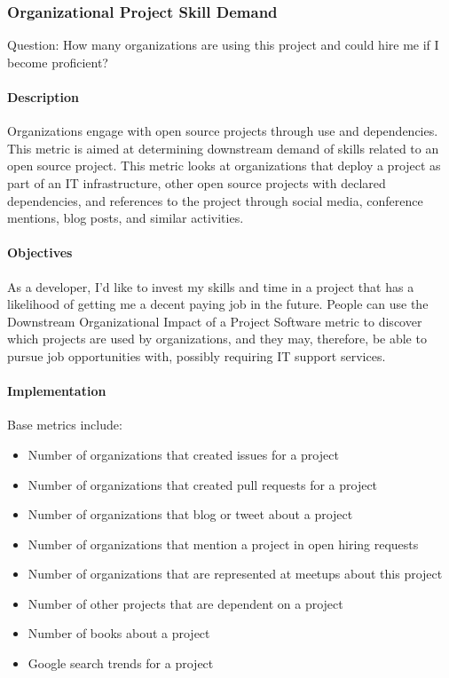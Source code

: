 \hypertarget{organizational-project-skill-demand}{%
\subsubsection{Organizational Project Skill
Demand}\label{organizational-project-skill-demand}}

Question: How many organizations are using this project and could hire
me if I become proficient?

\hypertarget{description}{%
\paragraph{Description}\label{description}}

Organizations engage with open source projects through use and
dependencies. This metric is aimed at determining downstream demand of
skills related to an open source project. This metric looks at
organizations that deploy a project as part of an IT infrastructure,
other open source projects with declared dependencies, and references to
the project through social media, conference mentions, blog posts, and
similar activities.

\hypertarget{objectives}{%
\paragraph{Objectives}\label{objectives}}

As a developer, I'd like to invest my skills and time in a project that
has a likelihood of getting me a decent paying job in the future. People
can use the Downstream Organizational Impact of a Project Software
metric to discover which projects are used by organizations, and they
may, therefore, be able to pursue job opportunities with, possibly
requiring IT support services.

\hypertarget{implementation}{%
\paragraph{Implementation}\label{implementation}}

Base metrics include:

\begin{itemize}
\tightlist
\item
  Number of organizations that created issues for a project
\item
  Number of organizations that created pull requests for a project
\item
  Number of organizations that blog or tweet about a project
\item
  Number of organizations that mention a project in open hiring requests
\item
  Number of organizations that are represented at meetups about this
  project
\item
  Number of other projects that are dependent on a project
\item
  Number of books about a project
\item
  Google search trends for a project
\end{itemize}


